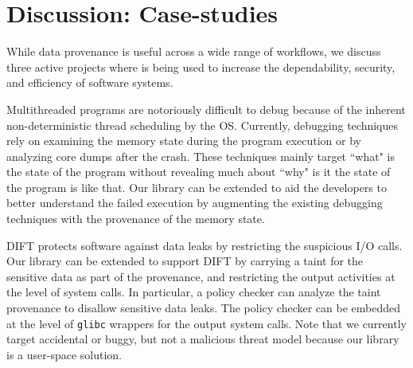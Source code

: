 \section{Discussion: Case-studies}
\label{sec:discussion}
While data provenance is useful across a wide range of workflows, we discuss three active projects where \projecttitle is being used to increase the dependability, security, and efficiency of software systems. 

 Multithreaded programs are notoriously difficult to debug because of the inherent non-deterministic thread scheduling by the OS.  Currently, debugging techniques rely on examining the memory state during the program execution or by analyzing core dumps after the crash. These techniques mainly target ``what" is the state of the program without revealing much about ``why" is it the state of the program is like that. Our library can be extended to aid the developers to better understand the failed execution by augmenting the existing debugging techniques with the provenance of the memory state.


%
%
%


 DIFT protects software against data leaks by restricting the suspicious I/O calls. Our library can be extended to support DIFT by carrying a taint for the sensitive data as part of the provenance, and  restricting the output activities at the level of system calls. In particular, a policy checker can analyze the taint provenance to disallow sensitive data leaks. The policy checker can be embedded at the level of {\tt glibc} wrappers for the output system calls. Note that we currently target accidental or buggy, but not a malicious threat model because our library is a user-space solution.



